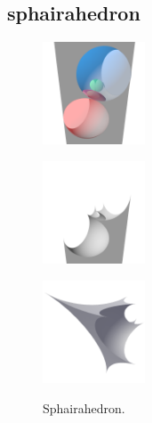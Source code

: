 \documentclass[suppldata, dvipdfmx]{interact}
\theoremstyle{plain}%
\theoremstyle{definition}
\theoremstyle{remark}
\theoremstyle{problemstyle}
\begin{document}
\subsection{sphairahedron}
\begin{figure}[h!tbp]
  \begin{minipage}[t]{0.3\textwidth}
   \centering
   \includegraphics[width=1.2in, height=1.2in, keepaspectratio]
   {./img/sphairahedralPrism/sphairaAll.png}
   \label{fig:sphairaPrismAll}
  \end{minipage}
  \hspace*{\fill}
  \begin{minipage}[t]{0.3\textwidth}
   \centering
   \includegraphics[width=1.2in, height=1.2in, keepaspectratio]
   {./img/sphairahedralPrism/sphairaHalf.png}
   \label{fig:sphairaPrismHalf}
  \end{minipage}
  \hspace*{\fill}
  \begin{minipage}[t]{0.3\textwidth}
   \centering
   \includegraphics[width=1.2in, height=1.2in,
   keepaspectratio]{./img/sphairahedralPrism/sphairahedron.png} 
   \label{fig:sphairahedronFinite}
  \end{minipage}
  \hspace*{\fill}
  \caption{Sphairahedron.}
  \label{fig:sphairahedron}
 \end{figure}
\end{document}
